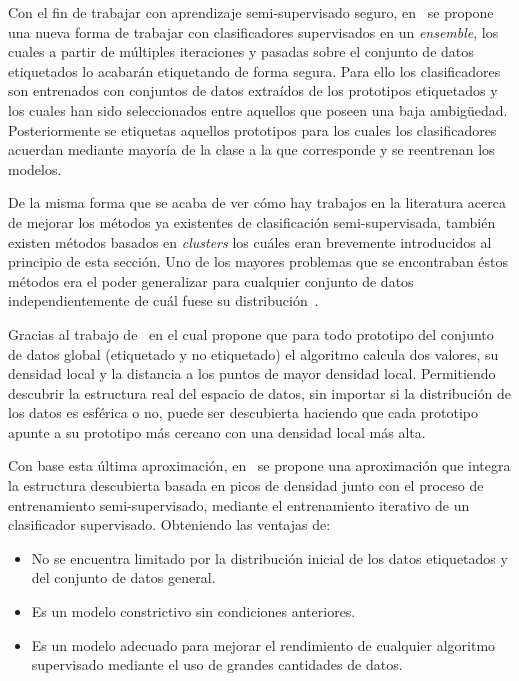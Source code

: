 Con el fin de trabajar con aprendizaje semi-supervisado seguro, en~\cite{zhao2021safe} se propone una nueva forma de trabajar con clasificadores supervisados en un \textit{ensemble}, los cuales a partir de múltiples iteraciones y pasadas sobre el conjunto de datos etiquetados lo acabarán etiquetando de forma segura. Para ello los clasificadores son entrenados con conjuntos de datos extraídos de los prototipos etiquetados y los cuales han sido seleccionados entre aquellos que poseen una baja ambigüedad. Posteriormente se etiquetas aquellos prototipos para los cuales los clasificadores acuerdan mediante mayoría de la clase a la que corresponde y se reentrenan los modelos.

De la misma forma que se acaba de ver cómo hay trabajos en la literatura acerca de mejorar los métodos ya existentes de clasificación semi-supervisada, también existen métodos basados en \textit{clusters} los cuáles eran brevemente introducidos al principio de esta sección. Uno de los mayores problemas que se encontraban éstos métodos era el poder generalizar para cualquier conjunto de datos independientemente de cuál fuese su distribución~\cite{adankon2011help, gan2013using}.

Gracias al trabajo de~\cite{rodriguez2014clustering} en el cual propone que para todo prototipo del conjunto de datos global (etiquetado y no etiquetado) el algoritmo calcula dos valores, su densidad local y la distancia a los puntos de mayor densidad local. Permitiendo descubrir la estructura real del espacio de datos, sin importar si la distribución de los datos es esférica o no, puede ser descubierta haciendo que cada prototipo apunte a su prototipo más cercano con una densidad local más alta.

Con base esta última aproximación, en~\cite{wu2018self} se propone una aproximación que integra la estructura descubierta basada en picos de densidad junto con el proceso de entrenamiento semi-supervisado, mediante el entrenamiento iterativo de un clasificador supervisado. Obteniendo las ventajas de:
\begin{itemize}
\item No se encuentra limitado por la distribución inicial de los datos etiquetados y del conjunto de datos general.
\item Es un modelo constrictivo sin condiciones anteriores.
\item Es un modelo adecuado para mejorar el rendimiento de cualquier algoritmo supervisado mediante el uso de grandes cantidades de datos.
\end{itemize}